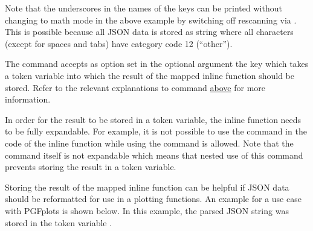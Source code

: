 \documentclass[a4paper]{article}
\begin{document}
{{

Note that the underscores in the names of the keys can be printed without changing to math mode in the above example by switching off rescanning via . This is possible because all JSON data is stored as string where all characters (except for spaces and tabs) have category code 12 (``other'').

The command \macro{\JSONParseArrayMapInline} accepts as option set in the optional argument the key  which takes a token variable into which the result of the mapped inline function should be stored. Refer to the relevant explanations to command \macro{\JSONParseArrayUse} \hyperlink{macro:arrayuse}{above} for more information.

\warning In order for the result to be stored in a token variable, the inline function needs to be fully expandable. For example, it is not possible to use the command \macro{\JSONParseValue} in the code of the inline function while using the command \macro{\JSONParseExpandableValue} is allowed. Note that the command \macro{\JSONParseArrayMapInline} itself is not expandable which means that nested use of this command prevents storing the result in a token variable.

Storing the result of the mapped inline function can be helpful if JSON data should be reformatted for use in a plotting functions. An example for a use case with PGFplots is shown below. In this example, the parsed JSON string  was stored in the token variable \macro{\myJSONplotdata}.

\pgfplotsset{width=5.25cm}

\begin{codeexamplecolumns}

\end{codeexamplecolumns}

}}
\end{document}
